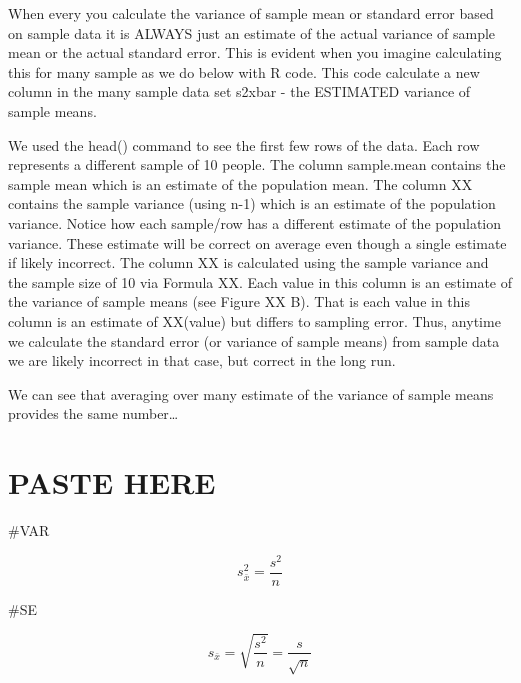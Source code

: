 \documentclass[
]{krantz}
\makeatletter
\newenvironment{Shaded}{\begin{snugshade}}{\end{snugshade}}
\newcommand{\DataTypeTok}[1]{\textcolor[rgb]{0.27,0.27,0.27}{#1}}
\newcommand{\DecValTok}[1]{\textcolor[rgb]{0.06,0.06,0.06}{#1}}
\newcommand{\KeywordTok}[1]{\textcolor[rgb]{0.27,0.27,0.27}{\textbf{#1}}}
\newcommand{\NormalTok}[1]{#1}
\newcommand{\OperatorTok}[1]{\textcolor[rgb]{0.43,0.43,0.43}{\textbf{#1}}}
\newcommand{\StringTok}[1]{\textcolor[rgb]{0.5,0.5,0.5}{#1}}
\newenvironment{kframe}{%
\medskip{}
\setlength{\fboxsep}{.8em}
 \def\at@end@of@kframe{}%
 \ifinner\ifhmode%
  \def\at@end@of@kframe{\end{minipage}}%
  \begin{minipage}{\columnwidth}%
 \fi\fi%
 \def\FrameCommand##1{\hskip\@totalleftmargin \hskip-\fboxsep
 \colorbox{shadecolor}{##1}\hskip-\fboxsep
     \hskip-\linewidth \hskip-\@totalleftmargin \hskip\columnwidth}%
 \MakeFramed {\advance\hsize-\width
   \@totalleftmargin\z@ \linewidth\hsize
   \@setminipage}}%
 {\par\unskip\endMakeFramed%
 \at@end@of@kframe}
\renewenvironment{Shaded}{\begin{kframe}}{\end{kframe}}
\makeatother
\begin{document}
When every you calculate the variance of sample mean or standard error based on sample data it is ALWAYS just an estimate of the actual variance of sample mean or the actual standard error. This is evident when you imagine calculating this for many sample as we do below with R code. This code calculate a new column in the many sample data set s2xbar - the ESTIMATED variance of sample means.

We used the head() command to see the first few rows of the data. Each row represents a different sample of 10 people. The column sample.mean contains the sample mean which is an estimate of the population mean. The column XX contains the sample variance (using n-1) which is an estimate of the population variance. Notice how each sample/row has a different estimate of the population variance. These estimate will be correct on average even though a single estimate if likely incorrect. The column XX is calculated using the sample variance and the sample size of 10 via Formula XX. Each value in this column is an estimate of the variance of sample means (see Figure XX B). That is each value in this column is an estimate of XX(value) but differs to sampling error. Thus, anytime we calculate the standard error (or variance of sample means) from sample data we are likely incorrect in that case, but correct in the long run.

We can see that averaging over many estimate of the variance of sample means provides the same number\ldots{}

\hypertarget{paste-here}{%
\section{PASTE HERE}\label{paste-here}}

\#VAR

\begin{equation} 
s_{\bar{x}}^2 = \frac{s^2}{n}
      \label{eq:samplevar2estchnext}
\end{equation}

\#SE

\begin{equation} 
s_{\bar{x}} = \sqrt{\frac{s^2}{n}} = \frac{s}{{\sqrt{n}}}
      \label{eq:samplese2estchnext}
\end{equation}

\begin{Shaded}
\end{Shaded}
\end{document}
